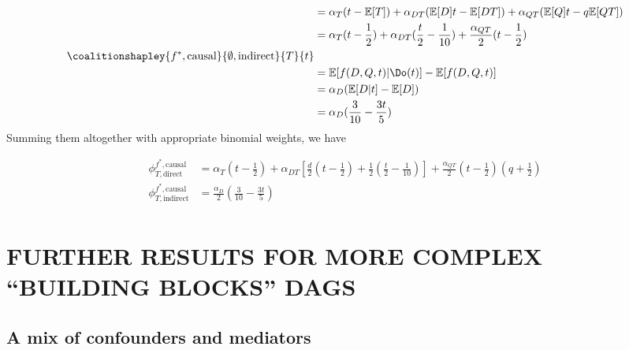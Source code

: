 \begin{align*}
    &= \alpha_T(t - \mathbb{E}[T]) + \alpha_{DT}(\mathbb{E}[D]t - \mathbb{E}[DT]) + \alpha_{QT}(\mathbb{E}[Q]t - q\mathbb{E}[QT]) \\
    &=  \alpha_T(t - \frac{1}{2}) + \alpha_{DT}(\frac{t}{2} - \frac{1}{10}) + \frac{\alpha_{QT}}{2} (t - \frac{1}{2}) \\
    \coalitionshapley{f^*,\text{causal}}{\emptyset,\text{indirect}}{T}{t} \\
    &=  \mathbb{E}[f(D,Q,t) | \Do(t)] - \mathbb{E}[f(D,Q,t)] \\
    &= \alpha_D (\mathbb{E}[D|t] - \mathbb{E}[D]) \\
    &= \alpha_D (\frac{3}{10} - \frac{3t}{5}) \\
\end{align*}
Summing them altogether with appropriate binomial weights, we have

\begin{align*}
    \phi^{f^*,\text{causal}}_{T,\text{direct}} &= \alpha_T(t - \frac{1}{2}) + \alpha_{DT}[\frac{d}{2}(t - \frac{1}{2}) + \frac{1}{2}(\frac{t}{2} - \frac{1}{10})] + \frac{\alpha_{QT}}{2}(t - \frac{1}{2})(q + \frac{1}{2}) \\
    \phi^{f^*,\text{causal}}_{T,\text{indirect}} &= \frac{\alpha_D}{2}  (\frac{3}{10} - \frac{3t}{5}) \\
\end{align*}


\section{FURTHER RESULTS FOR MORE COMPLEX ``BUILDING BLOCKS'' DAGS} \label{sec:further_blocks}

\subsection{A mix of confounders and mediators}

